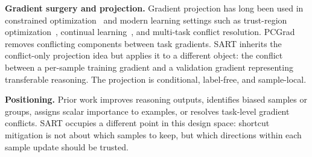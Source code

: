 \textbf{Gradient surgery and projection.}
Gradient projection has long been used in constrained optimization~\cite{rosen1960gradient} and modern learning settings such as trust-region optimization~\cite{schulman2015trust}, continual learning~\cite{kirkpatrick2017overcoming}, and multi-task conflict resolution. PCGrad~\cite{yu2020gradient} removes conflicting components between task gradients. SART inherits the conflict-only projection idea but applies it to a different object: the conflict between a per-sample training gradient and a validation gradient representing transferable reasoning. The projection is conditional, label-free, and sample-local.

\textbf{Positioning.}
Prior work improves reasoning outputs, identifies biased samples or groups, assigns scalar importance to examples, or resolves task-level gradient conflicts. SART occupies a different point in this design space: shortcut mitigation is not about which samples to keep, but which directions within each sample update should be trusted.
